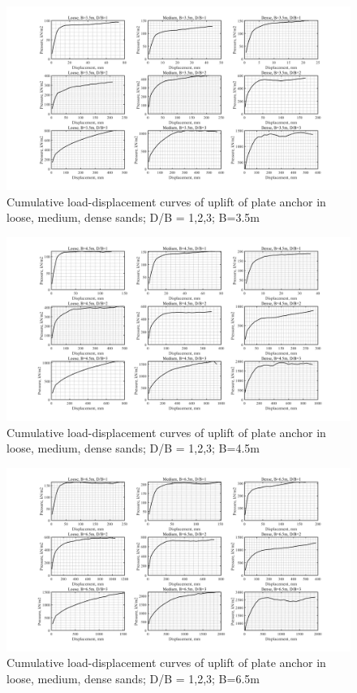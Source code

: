 \documentclass[a4paper, nobind]{templates/ociamthesis}
\begin{document}
\begin{figure}[H]
\includegraphics[width=1\linewidth]{myfigureeeeee/CodeD} \caption{Cumulative load-displacement curves of uplift of plate anchor in loose, medium, dense sands; D/B = 1,2,3; B=3.5m}\label{fig:unnamed-chunk-37}
\end{figure}

\begin{figure}[H]
\includegraphics[width=1\linewidth]{myfigureeeeee/CodeE} \caption{Cumulative load-displacement curves of uplift of plate anchor in loose, medium, dense sands; D/B = 1,2,3; B=4.5m}\label{fig:unnamed-chunk-38}
\end{figure}

\begin{figure}[H]
\includegraphics[width=1\linewidth]{myfigureeeeee/CodeG} \caption{Cumulative load-displacement curves of uplift of plate anchor in loose, medium, dense sands; D/B = 1,2,3; B=6.5m}\label{fig:unnamed-chunk-39}
\end{figure}
\end{document}
